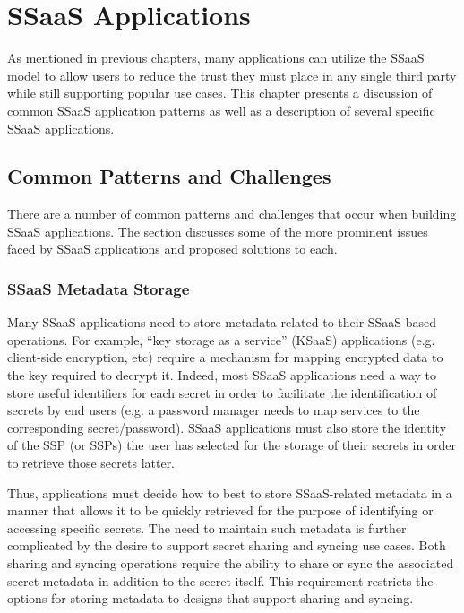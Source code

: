 \chapter{SSaaS Applications}
\label{chap:apps}

As mentioned in previous chapters, many applications can utilize the
SSaaS model to allow users to reduce the trust they must place in any
single third party while still supporting popular use cases. This
chapter presents a discussion of common SSaaS application patterns as
well as a description of several specific SSaaS applications.

\section{Common Patterns and Challenges}

There are a number of common patterns and challenges that occur when
building SSaaS applications. The section discusses some of the more
prominent issues faced by SSaaS applications and proposed solutions to
each.

\subsection{SSaaS Metadata Storage}

Many SSaaS applications need to store metadata related to their
SSaaS-based operations. For example, ``key storage as a service''
(KSaaS) applications (e.g. client-side encryption, etc) require a
mechanism for mapping encrypted data to the key required to decrypt
it. Indeed, most SSaaS applications need a way to store useful
identifiers for each secret in order to facilitate the identification
of secrets by end users (e.g. a password manager needs to map services
to the corresponding secret/password). SSaaS applications must also
store the identity of the SSP (or SSPs) the user has selected for the
storage of their secrets in order to retrieve those secrets latter.

Thus, applications must decide how to best to store SSaaS-related
metadata in a manner that allows it to be quickly retrieved for the
purpose of identifying or accessing specific secrets. The need to
maintain such metadata is further complicated by the desire to support
secret sharing and syncing use cases. Both sharing and syncing
operations require the ability to share or sync the associated secret
metadata in addition to the secret itself. This requirement restricts
the options for storing metadata to designs that support sharing and
syncing.

